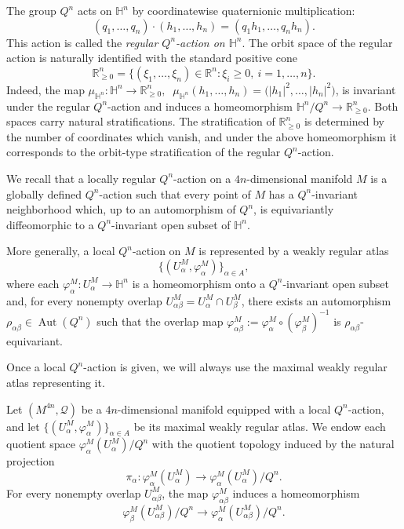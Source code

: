 \documentclass[11pt,a4paper]{article}
\numberwithin{equation}{section}
\theoremstyle{named}
\begin{document}
The group \(Q^n\) acts on \(\mathbb H^n\) by coordinatewise quaternionic multiplication:
\[
(q_1,\ldots,q_n)\cdot(h_1,\ldots,h_n)
=
(q_1h_1,\ldots,q_nh_n).
\]
This action is called the \emph{regular \(Q^n\)-action on \(\mathbb H^n\)}. The orbit space of the regular action is naturally identified with the standard positive cone
\[
\mathbb R_{\geq 0}^n
=
\lbrace (\xi_1,\ldots,\xi_n)\in\mathbb R^n: \xi_i\geq 0,\ i=1,\ldots,n
\rbrace.
\]
Indeed, the map $\mu_{\mathbb H^n}:\mathbb H^n\longrightarrow\mathbb R_{\geq 0}^n,\;\;
\mu_{\mathbb H^n}(h_1,\ldots,h_n)
=\bigl(|h_1|^2,\ldots,|h_n|^2\bigr)$,
is invariant under the regular \(Q^n\)-action and induces a homeomorphism $\mathbb H^n/Q^n\longrightarrow\mathbb R_{\geq 0}^n$.
Both spaces carry natural stratifications. The stratification of \(\mathbb R_{\geq 0}^n\) is determined by the number of coordinates which vanish, and under the above homeomorphism it corresponds to the orbit-type stratification of the regular \(Q^n\)-action.

We recall that a locally regular \(Q^n\)-action on a \(4n\)-dimensional manifold \(M\) is a globally defined \(Q^n\)-action such that every point of \(M\) has a \(Q^n\)-invariant neighborhood which, up to an automorphism of \(Q^n\), is equivariantly diffeomorphic to a \(Q^n\)-invariant open subset of \(\mathbb H^n\).

More generally, a local \(Q^n\)-action on \(M\) is represented by a weakly regular atlas
\[
\lbrace
(U_\alpha^M,\varphi_\alpha^M)
\rbrace_{\alpha\in A},
\]
where each $\varphi_\alpha^M:U_\alpha^M\longrightarrow\mathbb H^n$
is a homeomorphism onto a \(Q^n\)-invariant open subset and, for every nonempty overlap $U_{\alpha\beta}^M
=U_\alpha^M\cap U_\beta^M$,
there exists an automorphism $\rho_{\alpha\beta}\in\operatorname{Aut}(Q^n)$
such that the overlap map $\varphi_{\alpha\beta}^M
:=
\varphi_\alpha^M\circ(\varphi_\beta^M)^{-1}$ is \(\rho_{\alpha\beta}\)-equivariant.

\noindent Once a local \(Q^n\)-action is given, we will always use the maximal weakly regular atlas representing it.

Let \((M^{4n},\mathcal Q)\) be a \(4n\)-dimensional manifold equipped with a local \(Q^n\)-action, and let $\lbrace
(U_\alpha^M,\varphi_\alpha^M)
\rbrace_{\alpha\in A}$
be its maximal weakly regular atlas. We endow each quotient space $\varphi_\alpha^M(U_\alpha^M)/Q^n$
 with the quotient topology induced by the natural projection
\[
\pi_\alpha:
\varphi_\alpha^M(U_\alpha^M)
\longrightarrow
\varphi_\alpha^M(U_\alpha^M)/Q^n.
\]
For every nonempty overlap \(U_{\alpha\beta}^M\), the map \(\varphi_{\alpha\beta}^M\) induces a homeomorphism
\[
\varphi_\beta^M(U_{\alpha\beta}^M)/Q^n
\longrightarrow
\varphi_\alpha^M(U_{\alpha\beta}^M)/Q^n.
\]
\end{document}

